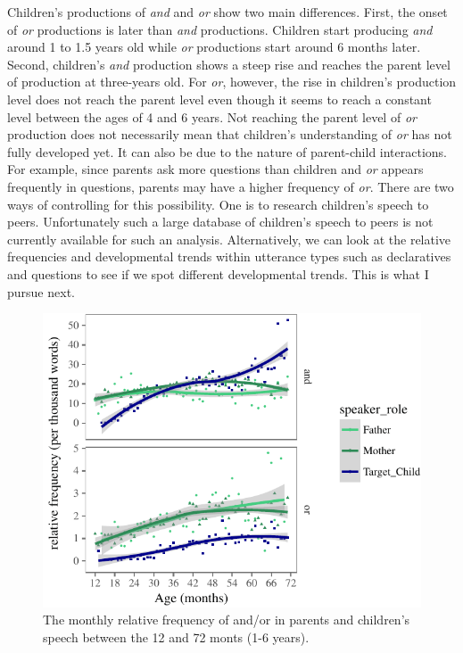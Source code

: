 \documentclass[oneside]{report}
\theoremstyle{definition}
\theoremstyle{definition}
\theoremstyle{definition}
\theoremstyle{remark}
\begin{document}
Children's productions of \emph{and} and \emph{or} show two main
differences. First, the onset of \emph{or} productions is later than
\emph{and} productions. Children start producing \emph{and} around 1 to
1.5 years old while \emph{or} productions start around 6 months later.
Second, children's \emph{and} production shows a steep rise and reaches
the parent level of production at three-years old. For \emph{or},
however, the rise in children's production level does not reach the
parent level even though it seems to reach a constant level between the
ages of 4 and 6 years. Not reaching the parent level of \emph{or}
production does not necessarily mean that children's understanding of
\emph{or} has not fully developed yet. It can also be due to the nature
of parent-child interactions. For example, since parents ask more
questions than children and \emph{or} appears frequently in questions,
parents may have a higher frequency of \emph{or}. There are two ways of
controlling for this possibility. One is to research children's speech
to peers. Unfortunately such a large database of children's speech to
peers is not currently available for such an analysis. Alternatively, we
can look at the relative frequencies and developmental trends within
utterance types such as declaratives and questions to see if we spot
different developmental trends. This is what I pursue next.
\begin{figure}[tb]

{\centering \includegraphics{figs/agePlot-1} 

}

\caption{The monthly relative frequency of and/or in parents and children's speech between the 12 and 72 monts (1-6 years).}\label{fig:agePlot}
\end{figure}
\end{document}
